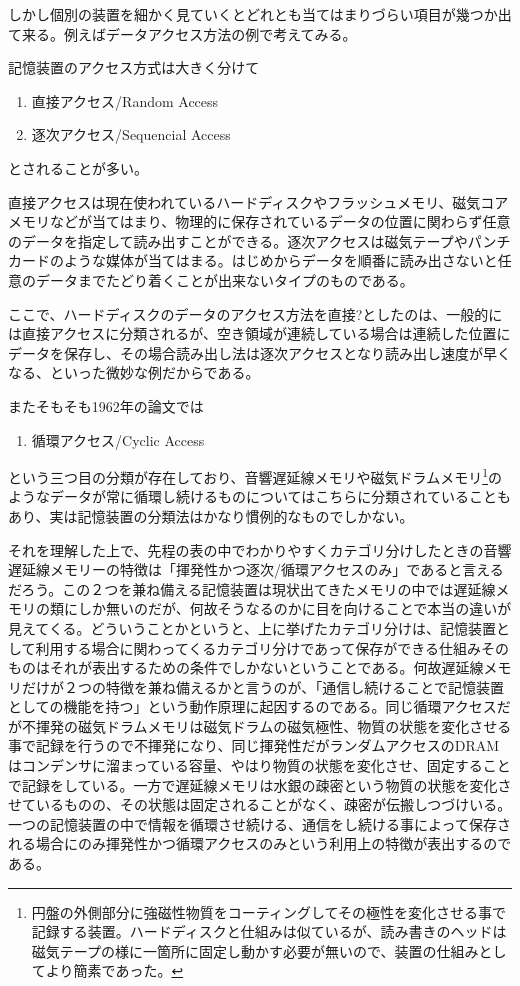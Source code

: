 \documentclass[a4paper,report]{jsbook}
\begin{document}
しかし個別の装置を細かく見ていくとどれとも当てはまりづらい項目が幾つか出て来る。例えばデータアクセス方法の例で考えてみる。

記憶装置のアクセス方式は大きく分けて

\begin{enumerate}
\def\labelenumi{\arabic{enumi}.}
\tightlist
\item
  直接アクセス/Random Access
\item
  逐次アクセス/Sequencial Access
\end{enumerate}

とされることが多い。

直接アクセスは現在使われているハードディスクやフラッシュメモリ、磁気コアメモリなどが当てはまり、物理的に保存されているデータの位置に関わらず任意のデータを指定して読み出すことができる。逐次アクセスは磁気テープやパンチカードのような媒体が当てはまる。はじめからデータを順番に読み出さないと任意のデータまでたどり着くことが出来ないタイプのものである。

ここで、ハードディスクのデータのアクセス方法を直接?としたのは、一般的には直接アクセスに分類されるが、空き領域が連続している場合は連続した位置にデータを保存し、その場合読み出し法は逐次アクセスとなり読み出し速度が早くなる、といった微妙な例だからである。

またそもそも1962年の論文では

\begin{enumerate}
\def\labelenumi{\arabic{enumi}.}
\tightlist
\item
  循環アクセス/Cyclic Access
\end{enumerate}

という三つ目の分類が存在しており、音響遅延線メモリや磁気ドラムメモリ\footnote{円盤の外側部分に強磁性物質をコーティングしてその極性を変化させる事で記録する装置。ハードディスクと仕組みは似ているが、読み書きのヘッドは磁気テープの様に一箇所に固定し動かす必要が無いので、装置の仕組みとしてより簡素であった。}のようなデータが常に循環し続けるものについてはこちらに分類されている\autocite{ishii:memory}こともあり、実は記憶装置の分類法はかなり慣例的なものでしかない。

それを理解した上で、先程の表の中でわかりやすくカテゴリ分けしたときの音響遅延線メモリーの特徴は「揮発性かつ逐次/循環アクセスのみ」であると言えるだろう。この２つを兼ね備える記憶装置は現状出てきたメモリの中では遅延線メモリの類にしか無いのだが、何故そうなるのかに目を向けることで本当の違いが見えてくる。どういうことかというと、上に挙げたカテゴリ分けは、記憶装置として利用する場合に関わってくるカテゴリ分けであって保存ができる仕組みそのものはそれが表出するための条件でしかないということである。何故遅延線メモリだけが２つの特徴を兼ね備えるかと言うのが、「通信し続けることで記憶装置としての機能を持つ」という動作原理に起因するのである。同じ循環アクセスだが不揮発の磁気ドラムメモリは磁気ドラムの磁気極性、物質の状態を変化させる事で記録を行うので不揮発になり、同じ揮発性だがランダムアクセスのDRAMはコンデンサに溜まっている容量、やはり物質の状態を変化させ、固定することで記録をしている。一方で遅延線メモリは水銀の疎密という物質の状態を変化させているものの、その状態は固定されることがなく、疎密が伝搬しつづけいる。一つの記憶装置の中で情報を循環させ続ける、通信をし続ける事によって保存される場合にのみ揮発性かつ循環アクセスのみという利用上の特徴が表出するのである。
\end{document}

